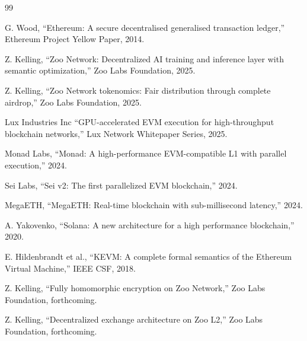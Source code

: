\begin{thebibliography}{99}

G. Wood, ``Ethereum: A secure decentralised generalised transaction ledger,'' Ethereum Project Yellow Paper, 2014.

Z. Kelling, ``Zoo Network: Decentralized AI training and inference layer with semantic optimization,'' Zoo Labs Foundation, 2025.

Z. Kelling, ``Zoo Network tokenomics: Fair distribution through complete airdrop,'' Zoo Labs Foundation, 2025.

Lux Industries Inc ``GPU-accelerated EVM execution for high-throughput blockchain networks,'' Lux Network Whitepaper Series, 2025.

Monad Labs, ``Monad: A high-performance EVM-compatible L1 with parallel execution,'' 2024.

Sei Labs, ``Sei v2: The first parallelized EVM blockchain,'' 2024.

MegaETH, ``MegaETH: Real-time blockchain with sub-millisecond latency,'' 2024.

A. Yakovenko, ``Solana: A new architecture for a high performance blockchain,'' 2020.

E. Hildenbrandt et al., ``KEVM: A complete formal semantics of the Ethereum Virtual Machine,'' IEEE CSF, 2018.

Z. Kelling, ``Fully homomorphic encryption on Zoo Network,'' Zoo Labs Foundation, forthcoming.

Z. Kelling, ``Decentralized exchange architecture on Zoo L2,'' Zoo Labs Foundation, forthcoming.

\end{thebibliography}

